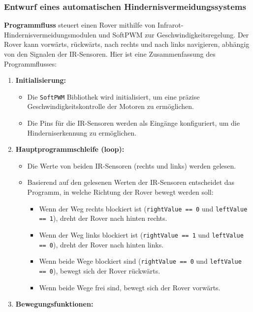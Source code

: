 \documentclass{vorlage-design-main}
\begin{document}
\hypertarget{entwurf-eines-automatischen-hindernisvermeidungssystems}{%
\subsubsection{Entwurf eines automatischen
Hindernisvermeidungssystems}\label{entwurf-eines-automatischen-hindernisvermeidungssystems}}

\textbf{Programmfluss} steuert einen Rover mithilfe von
Infrarot-Hindernisvermeidungsmodulen und SoftPWM zur
Geschwindigkeitsregelung. Der Rover kann vorwärts, rückwärts, nach
rechts und nach links navigieren, abhängig von den Signalen der
IR-Sensoren. Hier ist eine Zusammenfassung des Programmflusses:

\begin{enumerate}
\def\labelenumi{\arabic{enumi}.}

\item
  \textbf{Initialisierung:}

  \begin{itemize}
  
  \item
    Die \verb|SoftPWM| Bibliothek wird initialisiert,
    um eine präzise Geschwindigkeitskontrolle der Motoren zu
    ermöglichen.
  \item
    Die Pins für die IR-Sensoren werden als Eingänge konfiguriert, um
    die Hinderniserkennung zu ermöglichen.
  \end{itemize}
\item
  \textbf{Hauptprogrammschleife (loop):}

  \begin{itemize}
  
  \item
    Die Werte von beiden IR-Sensoren (rechts und links) werden gelesen.
  \item
    Basierend auf den gelesenen Werten der IR-Sensoren entscheidet das
    Programm, in welche Richtung der Rover bewegt werden soll:

    \begin{itemize}
    
    \item
      Wenn der Weg rechts blockiert ist
      (\verb|rightValue == 0| und
      \verb|leftValue == 1|), dreht der Rover nach
      hinten rechts.
    \item
      Wenn der Weg links blockiert ist
      (\verb|rightValue == 1| und
      \verb|leftValue == 0|), dreht der Rover nach
      hinten links.
    \item
      Wenn beide Wege blockiert sind
      (\verb|rightValue == 0| und
      \verb|leftValue == 0|), bewegt sich der Rover
      rückwärts.
    \item
      Wenn beide Wege frei sind, bewegt sich der Rover vorwärts.
    \end{itemize}
  \end{itemize}
\item
  \textbf{Bewegungsfunktionen:}


\end{enumerate}
\end{document}
